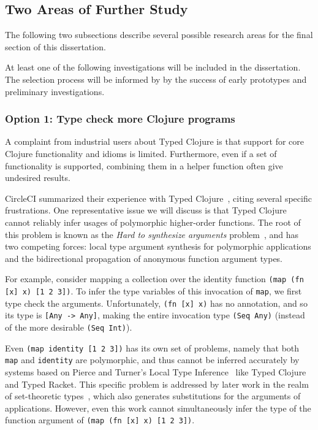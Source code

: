 \documentclass[9pt]{extarticle}
\begin{document}
\subsection{Two Areas of Further Study}

The following two subsections describe
several possible research areas for the final section of this
dissertation.

At least one of the following investigations will be included in the dissertation.
The selection process will be informed by by the success of early prototypes
and preliminary investigations.

\subsubsection{Option 1: Type check more Clojure programs}

A complaint from industrial users about Typed Clojure is that support for
core Clojure functionality and idioms is limited.
Furthermore, even if
a set of functionality is supported, combining them in a helper function
often give undesired results.

CircleCI summarized their experience with Typed Clojure~\cite{CircleCIBlog}, citing
several specific frustrations. One representative issue we will discuss
is that Typed Clojure cannot reliably infer usages of polymorphic higher-order functions.
The root of this problem is known as the \emph{Hard to synthesize arguments} problem~\cite{hosoya1999good}, and
has two competing forces: local type argument synthesis for polymorphic applications and
the bidirectional propagation of anonymous function argument types.

For example, consider mapping a collection over the identity function \texttt{(map (fn [x] x) [1 2 3])}.
To infer the type variables of this invocation of \texttt{map}, we first type check the arguments.
Unfortunately, \texttt{(fn [x] x)} has no annotation, and so its type is \texttt{[Any -> Any]}, making
the entire invocation type \texttt{(Seq Any)} (instead of the more desirable \texttt{(Seq Int)}).

Even \texttt{(map identity [1 2 3])} has its own set of problems, namely that both
\texttt{map} and \texttt{identity} are polymorphic, and thus cannot be inferred accurately by 
systems based on Pierce and Turner's Local Type Inference~\cite{PierceLTI} like Typed Clojure and Typed Racket.
This specific problem is addressed by later work in the realm of set-theoretic types~\cite{polyduce2},
which also generates substitutions for the arguments of applications. However, even
this work cannot simultaneously infer the type of the function argument of
\texttt{(map (fn [x] x) [1 2 3])}.
\end{document}
